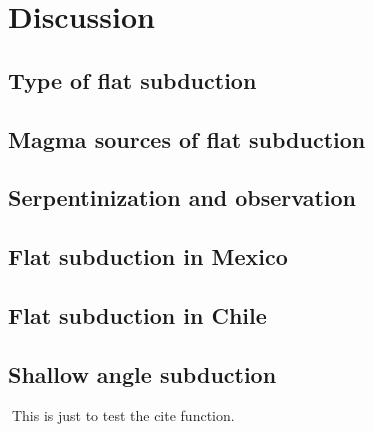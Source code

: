 
\chapter{Discussion}

\section{Type of flat subduction}

\section{Magma sources of flat subduction}

\section{Serpentinization and observation}

\section{Flat subduction in Mexico}

\section{Flat subduction in Chile}

\section{Shallow angle subduction}

This is just to test \cite{Krasnogor2004e} the cite function.